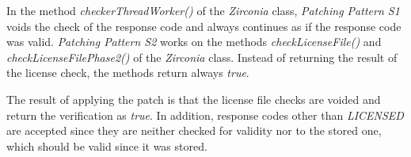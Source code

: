 In the method \textit{checkerThreadWorker()} of the \textit{Zirconia} class, \textit{Patching Pattern S1} voids the check of the response code and always continues as if the response code was valid.
\newline
\textit{Patching Pattern S2} works on the methods \textit{checkLicenseFile()} and \textit{checkLicenseFilePhase2()} of the \textit{Zirconia} class.
Instead of returning the result of the license check, the methods return always \textit{true}.
\newline

The result of applying the patch is that the license file checks are voided and return the verification as \textit{true}.
In addition, response codes other than \textit{LICENSED} are accepted since they are neither checked for validity nor to the stored one, which should be valid since it was stored.
